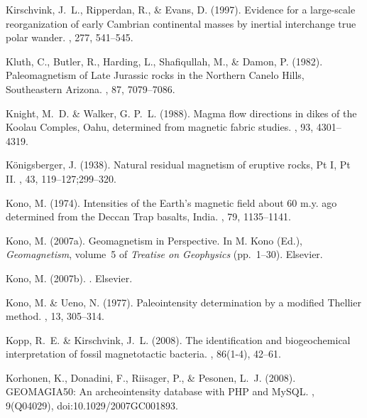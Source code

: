 \documentclass[11pt]{book}
\begin{document}
\begin{thebibliography}{}
Kirschvink, J.~L., Ripperdan, R., \& Evans, D. (1997).
\newblock Evidence for a large-scale reorganization of early Cambrian
  continental masses by inertial interchange true polar wander.
, 277, 541--545.

Kluth, C., Butler, R., Harding, L., Shafiqullah, M., \& Damon, P. (1982).
\newblock Paleomagnetism of Late Jurassic rocks in the Northern Canelo Hills,
  Southeastern Arizona.
, 87, 7079--7086.

Knight, M.~D. \& Walker, G. P.~L. (1988).
\newblock Magma flow directions in dikes of the Koolau Comples, Oahu,
  determined from magnetic fabric studies.
, 93, 4301--4319.

K\"onigsberger, J. (1938).
\newblock Natural residual magnetism of eruptive rocks, Pt I, Pt II.
, 43, 119--127;299--320.

Kono, M. (1974).
\newblock Intensities of the Earth's magnetic field about 60 m.y. ago
  determined from the Deccan Trap basalts, India.
, 79, 1135--1141.

Kono, M. (2007a).
\newblock Geomagnetism in Perspective.
\newblock In M. Kono (Ed.), {\em Geomagnetism}, volume~5 of {\em Treatise on
  Geophysics}  (pp.\ 1--30). Elsevier.

Kono, M. (2007b).
.
\newblock Elsevier.

Kono, M. \& Ueno, N. (1977).
\newblock Paleointensity determination by a modified Thellier method.
, 13, 305--314.

Kopp, R.~E. \& Kirschvink, J.~L. (2008).
\newblock The identification and biogeochemical interpretation of fossil
  magnetotactic bacteria.
, 86(1-4), 42--61.

Korhonen, K., Donadini, F., Riisager, P., \& Pesonen, L.~J. (2008).
\newblock GEOMAGIA50: An archeointensity database with PHP and MySQL.
, 9(Q04029),
  doi:10.1029/2007GC001893.


\end{thebibliography}
\end{document}
